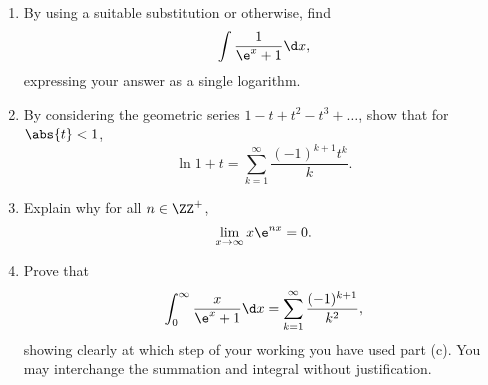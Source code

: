 \begin{problem}
    \begin{enumerate}
        \item By using a suitable substitution or otherwise, find \[\int \frac1{\e^x + 1} \d x,\] expressing your answer as a single logarithm.
        \item By considering the geometric series $1 - t + t^2 - t^3 + \dots$, show that for $\abs{t} < 1$, \[\ln{1 + t} = \sum_{k = 1}^\infty \frac{(-1)^{k+1} t^k}{k}.\]
        \item Explain why for all $n \in \ZZ^+$, \[\lim_{x \to \infty} x\e^{n x} = 0.\]
        \item Prove that \[\int_0^\infty \frac{x}{\e^x + 1} \d x = \sum_{k = 1}^\infty \frac{(-1)^{k+1}}{k^2},\] showing clearly at which step of your working you have used part (c). You may interchange the summation and integral without justification.
    \end{enumerate}
\end{problem}
\clearpage

